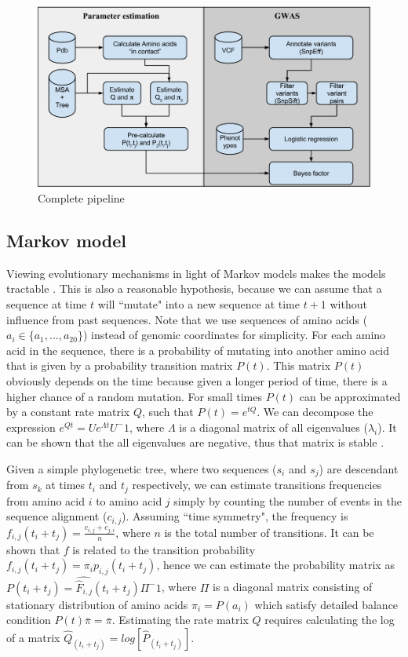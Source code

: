 \begin{figure}
    \centering
    \includegraphics[width=12cm]{gwas_epistasis_pipeline.png}
    \caption{Complete pipeline}
    \label{fig:gwaspipeline}
\end{figure}

\subsection{Markov model}

Viewing evolutionary mechanisms in light of Markov models makes the models tractable \cite{yang2006computational}. This is also a reasonable hypothesis, because we can assume that a sequence at time $t$ will ``mutate" into a new sequence at time $t+1$ without influence from past sequences. Note that we use sequences of amino acids ($a_i \in \{a_1, ..., a_{20}\}$) instead of genomic coordinates for simplicity. For each amino acid in the sequence, there is a probability of mutating into another amino acid \cite{felsenstein2004inferring} that is given by a probability transition matrix $P(t)$. This matrix $P(t)$ obviously depends on the time because given a longer period of time, there is a higher chance of a random mutation. For small times $P(t)$ can be approximated by a constant rate matrix $Q$, such that $P(t) = e^{tQ}$. We can decompose the expression $e^{Qt} = U e^{\Lambda t} U^-1$, where $\Lambda$ is a diagonal matrix of all eigenvalues ($\lambda_i$). It can be shown that the all eigenvalues are negative, thus that matrix is stable \cite{yang2006computational}.

Given a simple phylogenetic tree, where two sequences ($s_i$ and $s_j$) are descendant from $s_k$ at times $t_i$ and $t_j$ respectively, we can estimate transitions frequencies from amino acid $i$ to amino acid $j$ simply by counting the number of events in the sequence alignment ($c_{i,j}$). Assuming ``time symmetry", the frequency is $f_{i,j}(t_i+t_j) = \frac{c_{i,j} + c_{j,i}}{n}$, where $n$ is the total number of transitions. It can be shown that $f$ is related to the transition probability $f_{i,j}(t_i+t_j) = \pi_i p_{i,j}(t_i+t_j)$, hence we can estimate the probability matrix as $\hat{P(t_i+t_j) = \hat{F}_{i,j}(t_i+t_j) \Pi^-1}$, where $\Pi$ is a diagonal matrix consisting of stationary distribution of amino acids $\pi_i = P(a_i)$ which satisfy detailed balance condition $ P(t) \bar{\pi} = \bar{\pi}$. Estimating the rate matrix $Q$ requires calculating the log of a matrix $\hat{Q}_(t_i+t_j) = log[ \hat{P}_(t_i+t_j) ]$.

